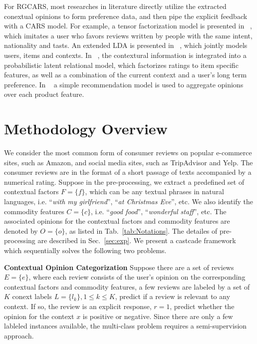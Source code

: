 \documentclass[sigconf]{acmart}
\begin{document}
For RGCARS, most researches in literature directly utilize the extracted conextual opinions to form preference data, and then pipe the explicit feedback with a CARS model. For example, a tensor factorization model is presented in ~\cite{Levi2012Finding}, which imitates a user who favors reviews written by people with the same intent, nationality and tasts.  An extended LDA is presented in ~\cite{Hariri2013Query}, which jointly models users, items and contexts. In ~\cite{Li2010Contextual}, the contextural information is integrated into a probabilistic latent relational model, which factorizes ratings to item specific features, as well as a combination of the current context and a user's long term preference. In ~\cite{Liu2013Combining} a simple recommendation model is used to aggregate opinions over each product feature. 

\section{Methodology Overview}\label{sec:method}

We consider the most common form of consumer reviews on popular e-commerce sites, such as Amazon, and social media sites, such as TripAdvisor and Yelp. The consumer reviews are in the format of a short passage of texts accompanied by a numerical rating. Suppose in the pre-processing, we extract a predefined set of contextual factors $F=\{f\}$, which can be any textual phrases in natural languages, i.e. ``\textit{with my girlfriend}'', ``\textit{at Christmas Eve}'', etc. We also identify the commodity features $C=\{c\}$, i.e.  ``\textit{good food}'', ``\textit{wonderful staff}'', etc. The associated opinions for the contextual factors and commodity features are denoted by $O=\{o\}$, as listed in Tab.~\ref{tab:Notations}. The detailes of pre-processing are described in Sec.~\ref{sec:exp}. We present a castcade framework which sequentially solves the following two problems. 

\textbf{Contextual Opinion Categorization} Suppose there are a set of reviews $E=\{e\}$, where each review consists of the user's opinion on the corresponding contextual factors and commodity features, a few reviews are labeled by a set of $K$ conext labels $L=\{l_k\},1\leq k\leq K$, predict if a review is relevant to any context. If so, the review is an explicit response, $r=1$, predict whether the opinion for the context $x$ is positive or negative. Since there are only a few lableled instances available, the multi-class problem requires a semi-supervision approach. 
\end{document}
